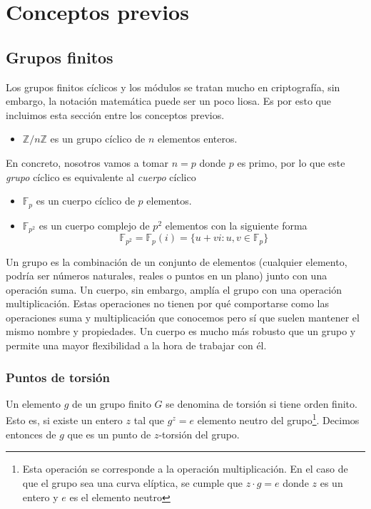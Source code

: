 \chapter{Conceptos previos}\label{conceptosprevios}

%
%

\section{Grupos finitos}

Los grupos finitos cíclicos y los módulos se tratan mucho en criptografía, sin embargo, la notación matemática puede ser un poco liosa. Es por esto que incluimos esta sección entre los conceptos previos.

\begin{itemize}
    \item $\mathbb{Z}/n\mathbb{Z}$ es un grupo cíclico de $n$ elementos enteros.
\end{itemize}

En concreto, nosotros vamos a tomar $n = p$ donde $p$ es primo, por lo que este \textit{grupo} cíclico es equivalente al \textit{cuerpo} cíclico

\begin{itemize}
    \item $\mathbb{F}_p$ es un cuerpo cíclico de $p$ elementos.

    \item $\mathbb{F}_{p^2}$ es un cuerpo complejo de $p^2$ elementos con la siguiente forma 
        \[ \mathbb{F}_{p^2} = \mathbb{F}_{p}(i) = \{ u + vi : u,v \in \mathbb{F}_{p} \} \]
\end{itemize}

Un grupo es la combinación de un conjunto de elementos (cualquier elemento, podría ser números naturales, reales o puntos en un plano) junto con una operación suma. Un cuerpo, sin embargo, amplía el grupo con una operación multiplicación.  Estas operaciones no tienen por qué comportarse como las operaciones suma y multiplicación que conocemos pero sí que suelen mantener el mismo nombre y propiedades. Un cuerpo es mucho más robusto que un grupo y permite una mayor flexibilidad a la hora de trabajar con él. 

\subsection{Puntos de torsión}

Un elemento $g$ de un grupo finito $G$ se denomina de torsión si tiene orden finito. Esto es, si existe un entero $z$ tal que $g^z = e$ elemento neutro del grupo\footnote{Esta operación se corresponde a la operación multiplicación. En el caso de que el grupo sea una curva elíptica, se cumple que $z \cdot g = e$ donde $z$ es un entero y $e$ es el elemento neutro}. Decimos entonces de $g$ que es un punto de $z$-torsión del grupo.

